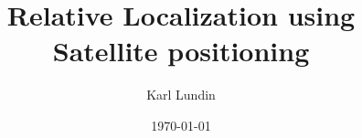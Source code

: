 \documentclass{Template/kthlatex-0.2rc4/kththesis/kththesis}
\title{Relative Localization using Satellite positioning}
\author{Karl Lundin}
\date{\today}
\begin{document}
\frontmatter

\titlepage


\tableofcontents
\mainmatter
 

 








\appendix

\appendix

\end{document}
